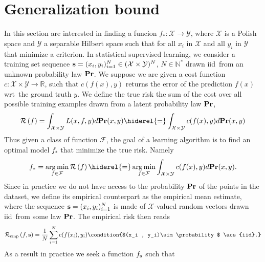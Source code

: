 
\section{Generalization bound}
\label{sec:generalization_bound}
In this section are interested in finding a funcion
$f_*:\mathcal{X}\to\mathcal{Y}$, where $\mathcal{X}$ is a Polish space and
$\mathcal{Y}$ a separable Hilbert space such that for all $x_i$ in
$\mathcal{X}$ and all $y_i$ in $\mathcal{Y}$ that minimize a criterion. In
statistical supervised learning, we consider a training set sequence
$\boldsymbol{\mathbf{s}}=(x_i,y_i)_{i=1}^N\in(\mathcal{X}\times\mathcal{Y})^N$,
$N\in\mathbb{N^*}$ drawn \acs{iid}~from an unknown probability law
${\mathbf{{Pr}}}$. We suppose we are given a cost function
$c:\mathcal{X}\times\mathcal{Y}\to\mathbb{R}$, such that $c(f(x),y)$ returns
the error of the prediction $f(x)$ \acs{wrt}~the ground truth $y$. We define
the true risk the sum of the cost over all possible training examples drawn
from a latent probability law ${\mathbf{{Pr}}}$,
\begin{dmath*}
    \risk{f}=\int_{\mathcal{X}\times\mathcal{Y}}L(x,f,y)d\probability(x,y)
    \hiderel{=}\int_{\mathcal{X}\times\mathcal{Y}}c(f(x), y)d\probability(x,y)
\end{dmath*}
Thus given a class of function $\mathcal{F}$, the goal of a learning algorithm
is to find an optimal model $f_*$ that minimize the true risk. Namely
\begin{dmath*}
    f_* = \argmin_{f\in\mathcal{F}} \risk{f}
    \hiderel{=}\argmin_{f\in\mathcal{F}}\int_{\mathcal{X} \times
    \mathcal{Y}}c(f(x), y)d\probability(x,y).
\end{dmath*}
Since in practice we do not have access to the probability ${\mathbf{{Pr}}}$ of
the points in the dataset, we define its empirical counterpart as the empirical
mean estimate, where the sequence $\boldsymbol{\mathbf{s}}=(x_i,y_i)_{i=1}^N$ is made of
$\mathcal{X}$-valued random vectors drawn \acs{iid}~from some law
${\mathbf{{Pr}}}$.
The empirical risk then reads
\begin{dmath*}
    \riskemp{f, \seq{s}}=\frac{1}{N}\sum_{i=1}^Nc(f(x_i),y_i) \condition{$(x_i
    , y_i)\sim \probability$ \acs{iid}.}
\end{dmath*}
As a result in practice we seek a function $f_{\boldsymbol{\mathbf{s}}}$ such that
